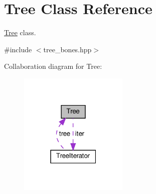 \hypertarget{classTree}{}\section{Tree Class Reference}
\label{classTree}


\hyperlink{classTree}{Tree} class.  




{\ttfamily \#include $<$tree\+\_\+bones.\+hpp$>$}



Collaboration diagram for Tree\+:
\nopagebreak
\begin{figure}[H]
\begin{center}
\leavevmode
\includegraphics[width=147pt]{classTree__coll__graph}
\end{center}
\end{figure}
